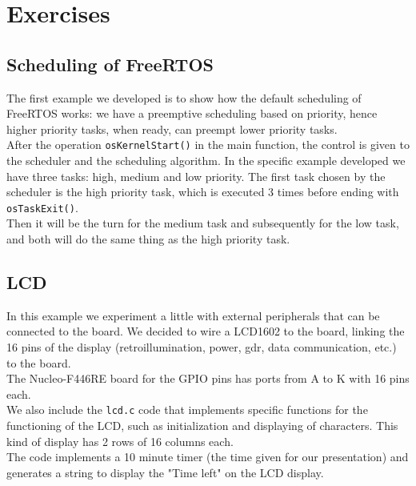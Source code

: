 \documentclass[a4paper,11pt]{report}
\begin{document}
\section{Exercises}
\subsection{Scheduling of FreeRTOS}
The first example we developed is to show how the default scheduling of FreeRTOS works: we have a preemptive scheduling based on priority, hence higher priority tasks, when ready, can preempt lower priority tasks. \\
After the operation \texttt{osKernelStart()} in the main function, the control is given to the scheduler and the scheduling algorithm. 
In the specific example developed we have three tasks: high, medium and low priority. The first task chosen by the scheduler is the high priority task, which is executed 3 times before ending  with \texttt{osTaskExit()}.\\
Then it will be the turn for the medium task and subsequently for the low task, and both will do the same thing as the high priority task.

\subsection{LCD}
In this example we experiment a little with external peripherals that can be connected to the board. We decided to wire a LCD1602 to the board, linking the 16 pins of the display (retroillumination, power, gdr, data communication, etc.) to the board. \\
The Nucleo-F446RE board for the GPIO pins has ports from A to K with 16 pins each. \\
We also include the \texttt{lcd.c} code that implements specific functions for the functioning of the LCD, such as initialization and displaying of characters. This kind of display has 2 rows of 16 columns each. \\
The code implements a 10 minute timer (the time given for our presentation) and generates a string to display the "Time left" on the LCD display.
   
\end{document}
